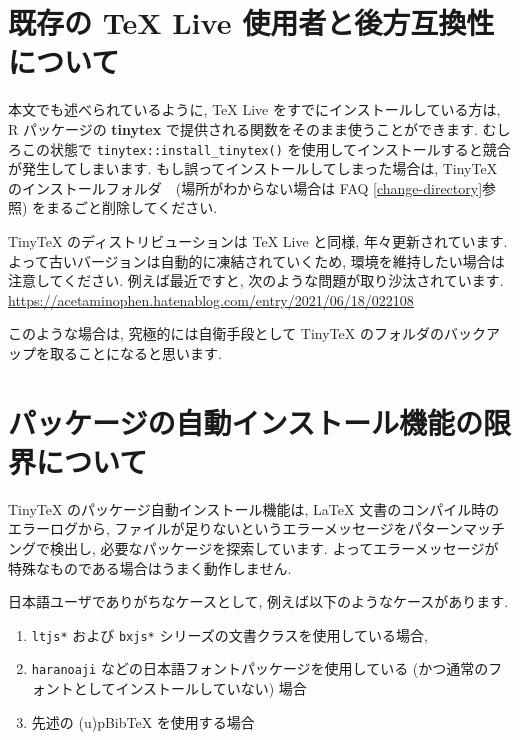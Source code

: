 \documentclass[
  xelatex,ja=standard,jafont=noto]{bxjsreport}
\providecommand{\tightlist}{%
  \setlength{\itemsep}{0pt}\setlength{\parskip}{0pt}}
\begin{document}
\hypertarget{ux65e2ux5b58ux306e-tex-live-ux4f7fux7528ux8005ux3068ux5f8cux65b9ux4e92ux63dbux6027ux306bux3064ux3044ux3066}{%
\section{既存の TeX Live
使用者と後方互換性について}\label{ux65e2ux5b58ux306e-tex-live-ux4f7fux7528ux8005ux3068ux5f8cux65b9ux4e92ux63dbux6027ux306bux3064ux3044ux3066}}

本文でも述べられているように, TeX Live をすでにインストールしている方は,
R パッケージの \textbf{tinytex}
で提供される関数をそのまま使うことができます. むしろこの状態で
\texttt{tinytex::install\_tinytex()}
を使用してインストールすると競合が発生してしまいます.
もし誤ってインストールしてしまった場合は, TinyTeX
のインストールフォルダ　(場所がわからない場合は FAQ
\ref{change-directory}参照) をまるごと削除してください.

TinyTeX のディストリビューションは TeX Live と同様,
年々更新されています. よって古いバージョンは自動的に凍結されていくため,
環境を維持したい場合は注意してください. 例えば最近ですと,
次のような問題が取り沙汰されています.
\url{https://acetaminophen.hatenablog.com/entry/2021/06/18/022108}

このような場合は, 究極的には自衛手段として TinyTeX
のフォルダのバックアップを取ることになると思います.

\hypertarget{ux30d1ux30c3ux30b1ux30fcux30b8ux306eux81eaux52d5ux30a4ux30f3ux30b9ux30c8ux30fcux30ebux6a5fux80fdux306eux9650ux754cux306bux3064ux3044ux3066}{%
\section{パッケージの自動インストール機能の限界について}\label{ux30d1ux30c3ux30b1ux30fcux30b8ux306eux81eaux52d5ux30a4ux30f3ux30b9ux30c8ux30fcux30ebux6a5fux80fdux306eux9650ux754cux306bux3064ux3044ux3066}}

TinyTeX のパッケージ自動インストール機能は, LaTeX
文書のコンパイル時のエラーログから,
ファイルが足りないというエラーメッセージをパターンマッチングで検出し,
必要なパッケージを探索しています.
よってエラーメッセージが特殊なものである場合はうまく動作しません.

日本語ユーザでありがちなケースとして,
例えば以下のようなケースがあります.

\begin{enumerate}
\def\labelenumi{\arabic{enumi}.}
\tightlist
\item
  \texttt{ltjs*} および \texttt{bxjs*}
  シリーズの文書クラスを使用している場合,
\item
  \texttt{haranoaji} などの日本語フォントパッケージを使用している
  (かつ通常のフォントとしてインストールしていない) 場合
\item
  先述の (u)pBibTeX を使用する場合
\end{enumerate}
\end{document}
